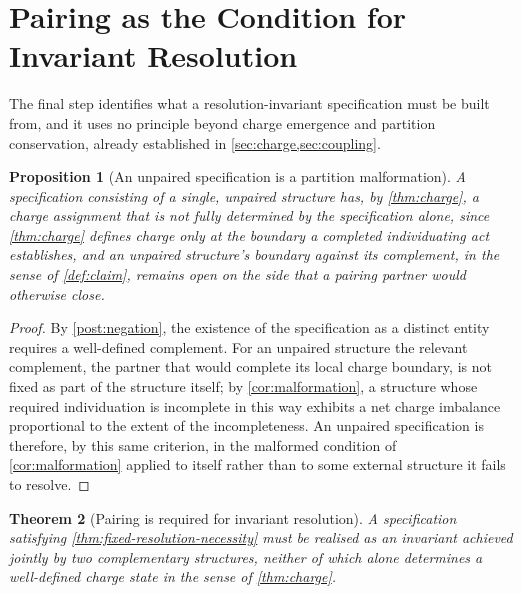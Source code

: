 \documentclass[11pt,twocolumn,a4paper]{article}
\theoremstyle{plain}
\newtheorem{theorem}{Theorem}[section]
\newtheorem{proposition}[theorem]{Proposition}
\theoremstyle{definition}
\theoremstyle{remark}
\begin{document}
\section{Pairing as the Condition for Invariant Resolution}
\label{sec:pairing-invariance}

The final step identifies what a resolution-invariant specification must
be built from, and it uses no principle beyond charge emergence and
partition conservation, already established in
\cref{sec:charge,sec:coupling}.

\begin{proposition}[An unpaired specification is a partition
malformation]
\label{prop:unpaired-malformation}
A specification consisting of a single, unpaired structure has, by
\cref{thm:charge}, a charge assignment that is not fully determined by
the specification alone, since \cref{thm:charge} defines charge only at
the boundary a completed individuating act establishes, and an unpaired
structure's boundary against its complement, in the sense of
\cref{def:claim}, remains open on the side that a pairing partner would
otherwise close.
\end{proposition}

\begin{proof}
By \cref{post:negation}, the existence of the specification as a distinct
entity requires a well-defined complement. For an unpaired structure the
relevant complement, the partner that would complete its local charge
boundary, is not fixed as part of the structure itself; by
\cref{cor:malformation}, a structure whose required individuation is
incomplete in this way exhibits a net charge imbalance proportional to the
extent of the incompleteness. An unpaired specification is therefore, by
this same criterion, in the malformed condition of \cref{cor:malformation}
applied to itself rather than to some external structure it fails to
resolve.
\end{proof}

\begin{theorem}[Pairing is required for invariant resolution]
\label{thm:pairing-necessity}
A specification satisfying \cref{thm:fixed-resolution-necessity} must be
realised as an invariant achieved jointly by two complementary structures,
neither of which alone determines a well-defined charge state in the
sense of \cref{thm:charge}.
\end{theorem}
\end{document}
